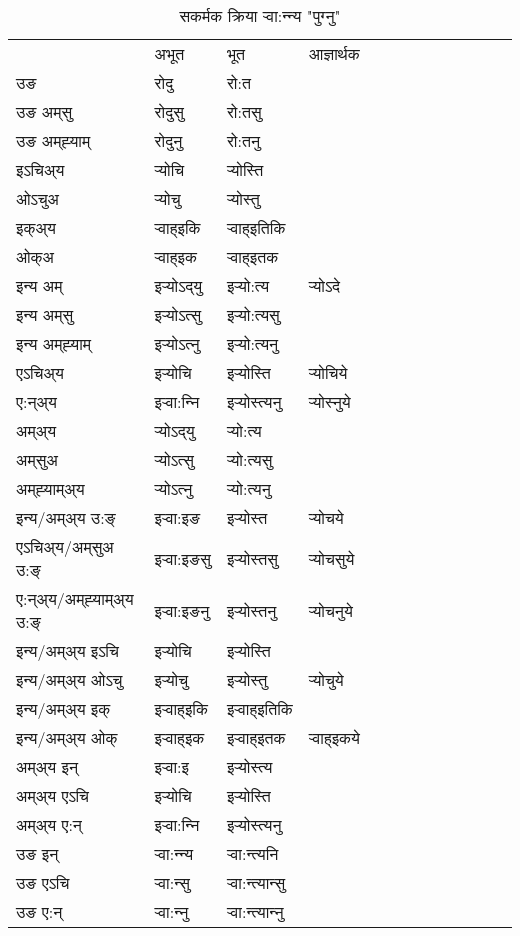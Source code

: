 \begin{table}[H]
\centering
\caption{\label{ot.vt} सकर्मक क्रिया  र्‍वा:न्‍न्य  "पुग्नु"  }
\begin{tabular}{l|l|l|l|l|l|l|l|l|l|l|l|l}  \toprule
&अभूत & भूत & आज्ञार्थक \\ 
उङ &रोदु &रो:त \\ 
उङ अम्‌सु &रोदुसु &रो:तसु \\ 
उङ अम्‌ह्‍याम् &रोदुनु &रो:तनु \\ 
इऽचिअ्य &र्‍योचि &र्‍योस्ति   \\ 
ओऽचुअ &र्‍योचु &र्‍योस्तु   \\ 
इक्अ्य &र्‍वाह्इकि &र्‍वाह्इतिकि   \\ 
ओक्अ &र्‍वाह्इक &र्‍वाह्इतक   \\ 
इन्य अम् & इर्‍योऽद्‌यु  & इर्‍यो:त्य &र्‍योऽदे  \\ 
इन्य अम्‌सु & इर्‍योऽत्सु  & इर्‍यो:त्यसु   \\ 
इन्य अम्‌ह्‍याम् & इर्‍योऽत्‍नु  & इर्‍यो:त्यनु   \\ 
एऽचिअ्य & इर्‍योचि & इर्‍योस्ति &र्‍योचिये    \\ 
ए:न्अ्य & इर्‍वा:न्‍नि  & इर्‍योस्त्यनु &र्‍योस्‍नुये  \\ 
अम्अ्य & र्‍योऽद्‌यु  & र्‍यो:त्य  \\ 
अम्‌सुअ & र्‍योऽत्सु & र्‍यो:त्यसु  \\ 
अम्‌ह्‍याम्अ्य & र्‍योऽत्‍नु  & र्‍यो:त्यनु \\ 
\midrule
इन्य/अम्अ्य उ:ङ्‌&इर्‍वा:इङ & इर्‍योस्त &र्‍योचये \\ 
एऽचिअ्य/अम्‌सुअ उ:ङ्‌ &इर्‍वा:इङसु & इर्‍योस्तसु &र्‍योचसुये \\ 
ए:न्अ्य/अम्‌ह्‍याम्अ्य उ:ङ्‌ &इर्‍वा:इङनु & इर्‍योस्तनु &र्‍योचनुये \\ 
इन्य/अम्अ्य इऽचि & इर्‍योचि & इर्‍योस्ति    \\ 
इन्य/अम्अ्य ओऽचु & इर्‍योचु & इर्‍योस्तु  &र्‍योचुये  \\ 
इन्य/अम्अ्य इक् & इर्‍वाह्इकि & इर्‍वाह्इतिकि   \\ 
इन्य/अम्अ्य ओक् & इर्‍वाह्इक & इर्‍वाह्इतक  &र्‍वाह्इकये  \\ 
अम्अ्य इन् & इर्‍वा:इ & इर्‍योस्त्य   \\ 
अम्अ्य एऽचि & इर्‍योचि & इर्‍योस्ति    \\ 
अम्अ्य ए:न् & इर्‍वा:न्‍नि  & इर्‍योस्त्यनु  \\ 
\midrule
उङ इन् & र्‍वा:न्‍न्य  & र्‍वा:न्त्यनि  \\ 
उङ एऽचि & र्‍वा:न्सु  & र्‍वा:न्त्यान्सु   \\ 
उङ ए:न्& र्‍वा:न्‍नु  & र्‍वा:न्त्यान्‍नु   \\ 
\bottomrule
\end{tabular}
\end{table}


